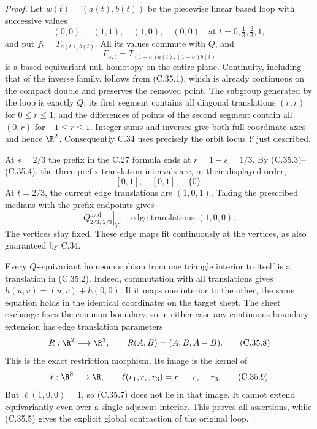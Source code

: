 \begin{proof}
Let $w(t)=(a(t),b(t))$ be the piecewise linear based
loop with successive values
\[
       (0,0),\quad(1,1),\quad(1,0),\quad(0,0)
           \quad\text{at }t=0,\tfrac13,\tfrac23,1,
                                                        \tag{C.35.4}
\]
and put $f_t=T_{a(t),b(t)}$.
All its values commute with $Q$, and
\[
                  F_{\sigma,t}
                  =T_{(1-\sigma)a(t),(1-\sigma)b(t)}
                                                        \tag{C.35.5}
\]
is a based equivariant null-homotopy on the entire plane.
Continuity, including that of the inverse family, follows
from (C.35.1), which is already continuous on the compact
double and preserves the removed point.
The subgroup generated by the loop is exactly $Q$:
its first segment contains all diagonal translations
$(r,r)$ for $0\leq r\leq1$, and the differences of
points of the second segment contain all $(0,r)$
for $-1\leq r\leq1$. Integer sums and inverses give
both full coordinate axes and hence $\R^2$.
Consequently C.34 uses precisely the orbit locus $Y$
just described.

At $s=2/3$ the prefix in the C.27 formula ends at
$r=1-s=1/3$. By (C.35.3)--(C.35.4), the three
prefix translation intervals are, in their displayed
order,
\[
                         [0,1],\quad[0,1],\quad\{0\}.
                                                        \tag{C.35.6}
\]
At $t=2/3$, the current edge translations are
$(1,0,1)$. Taking the prescribed medians with
the prefix endpoints gives
\[
       \left.Q^{\mathrm{med}}_{2/3,\,2/3}\right|_Y:
           \quad\text{edge translations }(1,0,0).
                                                        \tag{C.35.7}
\]
The vertices stay fixed. These edge maps fit
continuously at the vertices, as also guaranteed
by C.34.

Every $Q$-equivariant homeomorphism from one triangle
interior to itself is a translation in (C.35.2).
Indeed, commutation with all translations gives
$h(u,v)=(u,v)+h(0,0)$. If it maps one interior to
the other, the same equation holds in the identical
coordinates on the target sheet. The sheet exchange
fixes the common boundary, so in either case any
continuous boundary extension has edge translation
parameters
\[
  R:\R^2\longrightarrow\R^3,\qquad
                    R(A,B)=(A,B,A-B).                  \tag{C.35.8}
\]
This is the exact restriction morphism.
Its image is the kernel of
\[
       \ell:\R^3\longrightarrow\R,\qquad
                         \ell(r_1,r_2,r_3)=r_1-r_2-r_3.
                                                        \tag{C.35.9}
\]
But $\ell(1,0,0)=1$, so (C.35.7) does not lie in
that image. It cannot extend equivariantly even
over a single adjacent interior. This proves
all assertions, while (C.35.5) gives the explicit
global contraction of the original loop.
\end{proof}

